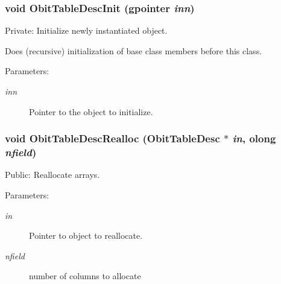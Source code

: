 \subsubsection{\setlength{\rightskip}{0pt plus 5cm}void Obit\-Table\-Desc\-Init (gpointer {\em inn})}\label{ObitTableDesc_8c_a2}


Private: Initialize newly instantiated object. 

Does (recursive) initialization of base class members before this class. \begin{Desc}
\item[Parameters:]
\begin{description}
\item[{\em inn}]Pointer to the object to initialize. \end{description}
\end{Desc}
\subsubsection{\setlength{\rightskip}{0pt plus 5cm}void Obit\-Table\-Desc\-Realloc ({\bf Obit\-Table\-Desc} $\ast$ {\em in}, {\bf olong} {\em nfield})}\label{ObitTableDesc_8c_a9}


Public: Reallocate arrays. 

\begin{Desc}
\item[Parameters:]
\begin{description}
\item[{\em in}]Pointer to object to reallocate. \item[{\em nfield}]number of columns to allocate \end{description}
\end{Desc}
